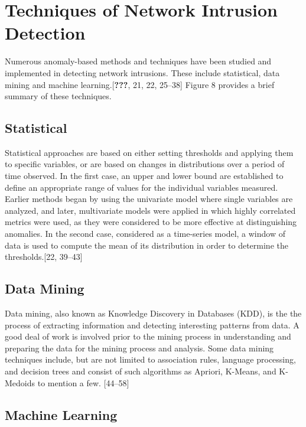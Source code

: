 \documentclass[11pt,]{article}
\begin{document}
\section{Techniques of Network Intrusion
Detection}\label{techniques-of-network-intrusion-detection}

Numerous anomaly-based methods and techniques have been studied and
implemented in detecting network intrusions. These include statistical,
data mining and machine learning.{[}\textbf{???}, 21, 22, 25--38{]}
Figure 8 provides a brief summary of these techniques.

\subsection{Statistical}\label{statistical}

Statistical approaches are based on either setting thresholds and
applying them to specific variables, or are based on changes in
distributions over a period of time observed. In the first case, an
upper and lower bound are established to define an appropriate range of
values for the individual variables measured. Earlier methods began by
using the univariate model where single variables are analyzed, and
later, multivariate models were applied in which highly correlated
metrics were used, as they were considered to be more effective at
distinguishing anomalies. In the second case, considered as a
time-series model, a window of data is used to compute the mean of its
distribution in order to determine the thresholds.{[}22, 39--43{]}

\subsection{Data Mining}\label{data-mining}

Data mining, also known as Knowledge Discovery in Databases (KDD), is
the the process of extracting information and detecting interesting
patterns from data. A good deal of work is involved prior to the mining
process in understanding and preparing the data for the mining process
and analysis. Some data mining techniques include, but are not limited
to association rules, language processing, and decision trees and
consist of such algorithms as Apriori, K-Means, and K-Medoids to mention
a few. {[}44--58{]}

\subsection{Machine Learning}\label{machine-learning}
\end{document}
